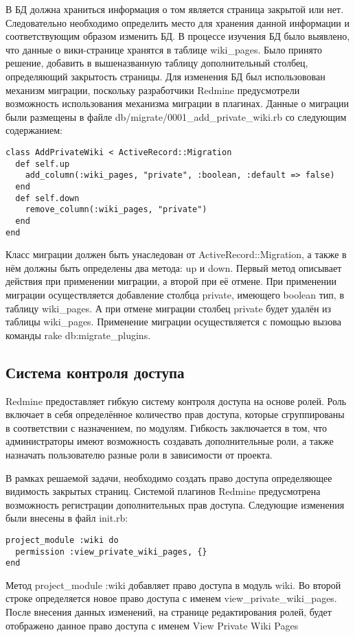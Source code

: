 В БД должна храниться информация о том является страница закрытой или нет.
Следовательно необходимо определить место для хранения данной информации и
соответствующим образом изменить БД. В процессе изучения БД было выявлено, что
данные о вики-странице хранятся в таблице wiki\_pages. Было принято решение,
добавить в вышеназванную таблицу дополнительный столбец, определяющий
закрытость страницы. Для изменения БД был использовован механизм миграции,
поскольку разработчики Redmine предусмотрели возможность использования
механизма миграции в плагинах. Данные о миграции были размещены в файле
db/migrate/0001\_add\_private\_wiki.rb со следующим содержанием:
\small{\begin{lstlisting}
class AddPrivateWiki < ActiveRecord::Migration
  def self.up
    add_column(:wiki_pages, "private", :boolean, :default => false)
  end
  def self.down
    remove_column(:wiki_pages, "private")
  end
end
\end{lstlisting}}
Класс миграции должен быть унаследован от ActiveRecord::Migration, а также в
нём должны быть определены два метода: up и down. Первый метод описывает
действия при применении миграции, а второй при её отмене. При применении
миграции осуществляется добавление столбца private, имеющего boolean тип, в
таблицу wiki\_pages. А при отмене миграции столбец private будет удалён из
таблицы wiki\_pages. Применение миграции осуществляется с помощью вызова
команды rake db:migrate\_plugins.

\subsection{Система контроля доступа}
\label{section:access_control}
Redmine предоставляет гибкую систему контроля доступа на основе ролей. Роль
включает в себя определённое количество прав доступа, которые сгруппированы в
соответствии с назначением, по модулям. Гибкость заключается в том, что
администраторы имеют возможность создавать дополнительные роли, а также
назначать пользователю разные роли в зависимости от проекта.

В рамках решаемой задачи, необходимо создать право доступа определяющее
видимость закрытых страниц. Системой плагинов Redmine предусмотрена
возможность регистрации дополнительных прав доступа. Следующие изменения были
внесены в файл init.rb:
\small{
\begin{lstlisting}
project_module :wiki do
  permission :view_private_wiki_pages, {}
end
\end{lstlisting}}
Метод project\_module :wiki добавляет право доступа в модуль wiki. Во второй
строке определяется новое право доступа с именем view\_private\_wiki\_pages.
После внесения данных изменений, на странице редактирования ролей, будет
отображено данное право доступа с именем View Private Wiki Pages

